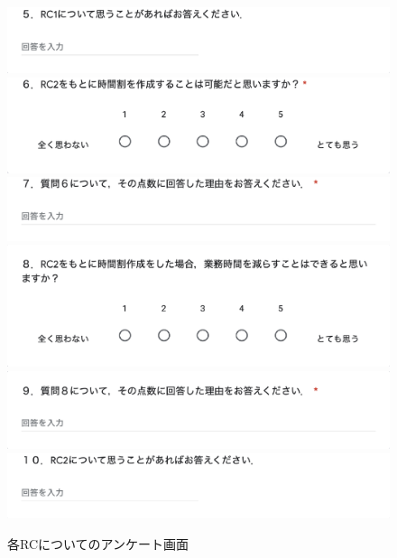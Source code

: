 \begin{figure}[htbp]
\begin{center}
\includegraphics[scale=0.5]{image/questionA/a6.eps}
\includegraphics[scale=0.5]{image/questionA/a7.eps}
\includegraphics[scale=0.5]{image/questionA/a8.eps}
\includegraphics[scale=0.5]{image/questionA/a9.eps}
\includegraphics[scale=0.5]{image/questionA/a10.eps}
\includegraphics[scale=0.5]{image/questionA/a11.eps}
\caption{各RCについてのアンケート画面}
\label{A2}
\end{center}
\end{figure}

